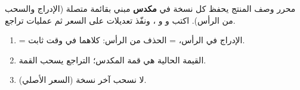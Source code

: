 \begin{statement}
محرر وصف المنتج يحفظ كل نسخة في \textbf{مكدس} مبني بقائمة متصلة (الإدراج والسحب من الرأس). اكتب  و  و ، ونفّذ تعديلات على السعر ثم عمليات تراجع.
\end{statement}
\begin{stepsbox}\begin{enumerate}
\item {} = الإدراج في الرأس،  = الحذف من الرأس: كلاهما في وقت ثابت.
\item القيمة الحالية هي قمة المكدس؛ التراجع يسحب القمة.
\item لا نسحب آخر نسخة (السعر الأصلي).
\end{enumerate}\end{stepsbox}
